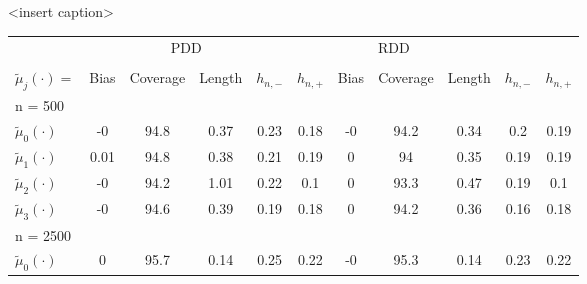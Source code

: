 \renewcommand{\arraystretch}{1.5}
\begin{table}[H]
\begin{center}
<insert caption>
\begin{tabular}{l@{\hskip 1em}c@{\hskip 1em}c@{\hskip 1em}c@{\hskip 1em}c@{\hskip 1em}c@{\hskip 1em}c@{\hskip 1em}c@{\hskip 1em}c@{\hskip 1em}c@{\hskip 1em}c}
\toprule
& \multicolumn{4}{c}{PDD} & \multicolumn{4}{c}{RDD} \\[-0.25em] 
\cmidrule(r{2em}){2-5} \cmidrule(r){6-9} & \\[-1.75em]
\hline
 $\tilde{\mu}_{j}(\cdot) = $              &   Bias &   Coverage &   Length &   $h_{n, -}$ &   $h_{n, +}$ &   Bias\vphantom{l} &   Coverage\vphantom{l} &   Length\vphantom{l} &   $h_{n, -}$\vphantom{l} &   $h_{n, +}$\vphantom{l} \\
\hline
 n = 500                                  &     &         &       &           &           &                 &                     &                   &                       &                       \\
 $\tilde{\mu}_{0}(\cdot)$\vphantom{500}   &  -0    &       94.8 &     0.37 &         0.23 &         0.18 &              -0    &                   94.2 &                 0.34 &                     0.2  &                     0.19 \\
 $\tilde{\mu}_{1}(\cdot)$\vphantom{500}   &   0.01 &       94.8 &     0.38 &         0.21 &         0.19 &               0    &                   94   &                 0.35 &                     0.19 &                     0.19 \\
 $\tilde{\mu}_{2}(\cdot)$\vphantom{500}   &  -0    &       94.2 &     1.01 &         0.22 &         0.1  &               0    &                   93.3 &                 0.47 &                     0.19 &                     0.1  \\
 $\tilde{\mu}_{3}(\cdot)$\vphantom{500}   &  -0    &       94.6 &     0.39 &         0.19 &         0.18 &               0    &                   94.2 &                 0.36 &                     0.16 &                     0.18 \\
 n = 2500                                 &     &         &       &           &           &                 &                     &                   &                       &                       \\
 $\tilde{\mu}_{0}(\cdot)$\vphantom{2500}  &   0    &       95.7 &     0.14 &         0.25 &         0.22 &              -0    &                   95.3 &                 0.14 &                     0.23 &                     0.22 \\

\end{tabular}
\end{center}
\end{table}
